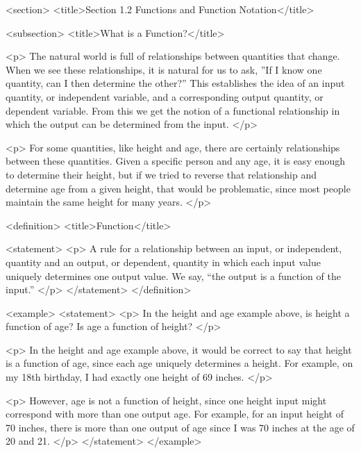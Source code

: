 <section>
    <title>Section 1.2 Functions and Function Notation</title>

    <subsection>
        <title>What is a Function?</title>

        <p>
            The natural world is full of relationships between quantities that change.
            When we see these relationships, it is natural for us to ask, ”If I know one quantity, can I then determine the other?” This establishes the idea of an input quantity, or independent variable, and a corresponding output quantity, or dependent variable.
            From this we get the notion of a functional relationship in which the output can be determined from the input.
        </p>

        <p>
            For some quantities, like height and age, there are certainly relationships between these quantities.
            Given a specific person and any age, it is easy enough to determine their height, but if we tried to reverse that relationship and determine age from a given height, that would be problematic, since most people maintain the same height for many years.
        </p>

        <definition>
            <title>Function</title>

            <statement>
                <p>
                    A rule for a relationship between an input, or independent, quantity and an output, or dependent, quantity in which each input value uniquely determines one output value.
                    We say, “the output is a function of the input.”
                </p>
            </statement>
        </definition>

        <example>
            <statement>
                <p>
                    In the height and age example above, is height a function of age? Is age a function of height?
                </p>

                <p>
                    In the height and age example above, it would be correct to say that height is a function of age, since each age uniquely determines a height.
                    For example, on my 18th birthday, I had exactly one height of 69 inches.
                </p>

                <p>
                    However, age is not a function of height, since one height input might correspond with more than one output age.
                    For example, for an input height of 70 inches, there is more than one output of age since I was 70 inches at the age of 20 and 21.
                </p>
            </statement>
        </example>

